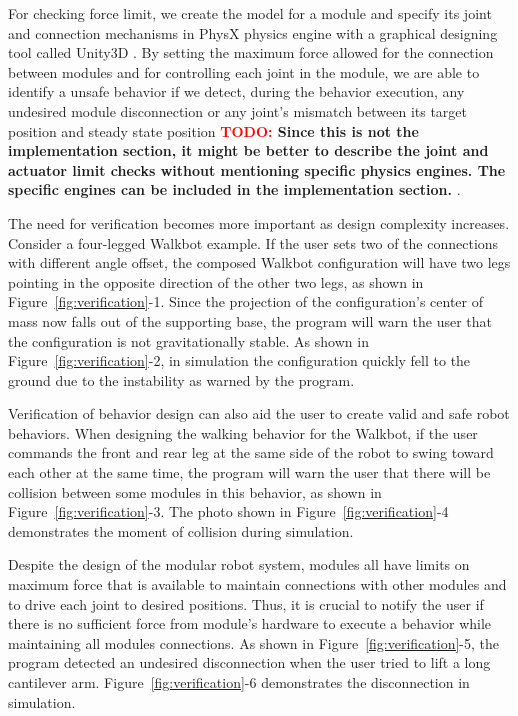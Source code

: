 \documentclass[graybox]{svmult}
\newcommand{\TODO}[1]{ {\bf \textcolor{red}{TODO:} #1 }}
\begin{document}
For checking force limit, we create the model for a module and specify its joint and connection mechanisms in PhysX \cite{PhysX} physics engine with a graphical designing tool called Unity3D \cite{Unity}. By setting the maximum force allowed for the connection between modules and for controlling each joint in the module, we are able to identify a unsafe behavior if we detect, during the behavior execution, any undesired module disconnection or any joint's mismatch between its target position and steady state position
\TODO{Since this is not the implementation section, it might be better to describe
the joint and actuator limit checks without mentioning specific physics engines.
 The specific engines can be included in the implementation section.}.

The need for verification becomes more important as design complexity increases. Consider a four-legged Walkbot example. If the user sets two of the connections with different angle offset, the composed Walkbot configuration will have two legs pointing in the opposite direction of the other two legs, as shown in Figure~\ref{fig:verification}-1. Since the projection of the configuration's center of mass now falls out of the supporting base, the program will warn the user that the configuration is not gravitationally stable. As shown in Figure~\ref{fig:verification}-2, in simulation the configuration quickly fell to the ground due to the instability as warned by the program. 

Verification of behavior design can also aid the user to create valid and safe robot behaviors. When designing the walking behavior for the Walkbot, if the user commands the front and rear leg at the same side of the robot to swing toward each other at the same time, the program will warn the user that there will be collision between some modules in this behavior, as shown in Figure~\ref{fig:verification}-3. The photo shown in Figure~\ref{fig:verification}-4 demonstrates the moment of collision during simulation.

Despite the design of the modular robot system, modules all have limits on maximum force that is available to maintain connections with other modules and to drive each joint to desired positions. Thus, it is crucial to notify the user if there is no sufficient force from module's hardware to execute a behavior while maintaining all modules connections. 
As shown in Figure~\ref{fig:verification}-5, the program detected an undesired disconnection when the user tried to lift a long cantilever arm. Figure~\ref{fig:verification}-6 demonstrates the disconnection in simulation.
 
\end{document}
